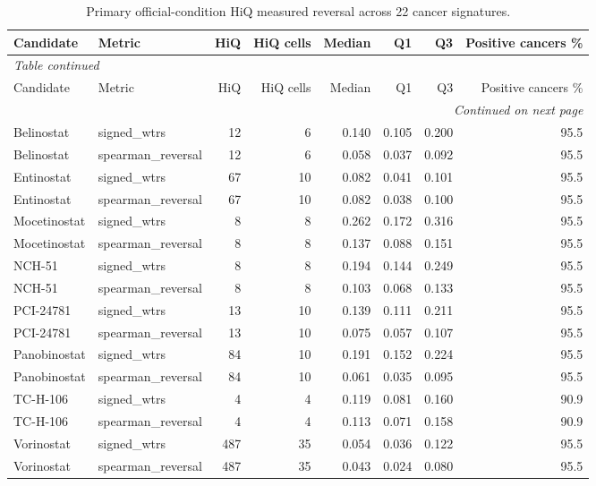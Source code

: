 \begingroup
\footnotesize
\begin{longtable}{@{}llrrrrrr@{}}
\caption{Primary official-condition HiQ measured reversal across 22 cancer signatures.}\label{tab:s_measured}\\
\toprule
Candidate & Metric & HiQ & HiQ cells & Median & Q1 & Q3 & Positive cancers \% \\
\midrule
\endfirsthead
\multicolumn{8}{l}{\textit{Table continued}}\\
\toprule
Candidate & Metric & HiQ & HiQ cells & Median & Q1 & Q3 & Positive cancers \% \\
\midrule
\endhead
\midrule
\multicolumn{8}{r}{\textit{Continued on next page}}\\
\endfoot
\bottomrule
\endlastfoot
Belinostat & signed\_wtrs & 12 & 6 & 0.140 & 0.105 & 0.200 & 95.5 \\
Belinostat & spearman\_reversal & 12 & 6 & 0.058 & 0.037 & 0.092 & 95.5 \\
Entinostat & signed\_wtrs & 67 & 10 & 0.082 & 0.041 & 0.101 & 95.5 \\
Entinostat & spearman\_reversal & 67 & 10 & 0.082 & 0.038 & 0.100 & 95.5 \\
Mocetinostat & signed\_wtrs & 8 & 8 & 0.262 & 0.172 & 0.316 & 95.5 \\
Mocetinostat & spearman\_reversal & 8 & 8 & 0.137 & 0.088 & 0.151 & 95.5 \\
NCH-51 & signed\_wtrs & 8 & 8 & 0.194 & 0.144 & 0.249 & 95.5 \\
NCH-51 & spearman\_reversal & 8 & 8 & 0.103 & 0.068 & 0.133 & 95.5 \\
PCI-24781 & signed\_wtrs & 13 & 10 & 0.139 & 0.111 & 0.211 & 95.5 \\
PCI-24781 & spearman\_reversal & 13 & 10 & 0.075 & 0.057 & 0.107 & 95.5 \\
Panobinostat & signed\_wtrs & 84 & 10 & 0.191 & 0.152 & 0.224 & 95.5 \\
Panobinostat & spearman\_reversal & 84 & 10 & 0.061 & 0.035 & 0.095 & 95.5 \\
TC-H-106 & signed\_wtrs & 4 & 4 & 0.119 & 0.081 & 0.160 & 90.9 \\
TC-H-106 & spearman\_reversal & 4 & 4 & 0.113 & 0.071 & 0.158 & 90.9 \\
Vorinostat & signed\_wtrs & 487 & 35 & 0.054 & 0.036 & 0.122 & 95.5 \\
Vorinostat & spearman\_reversal & 487 & 35 & 0.043 & 0.024 & 0.080 & 95.5 \\
\end{longtable}
\endgroup
